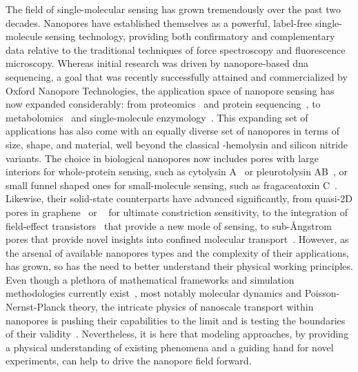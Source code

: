The field of single-molecular sensing has grown tremendously over the past two decades. Nanopores have
established themselves as a powerful, label-free single-molecule sensing technology, providing both
confirmatory and complementary data relative to the traditional techniques of force spectroscopy and
fluorescence microscopy. Whereas initial research was driven by nanopore-based \gls{dna} sequencing, a goal
that was recently successfully attained and commercialized by Oxford Nanopore Technologies, the application
space of nanopore sensing has now expanded considerably: from proteomics~\cite{Yusko-2017,Houghtaling-2019}
and protein sequencing~\cite{Restrepo-Perez-2018}, to metabolomics~\cite{Zernia-2020} and single-molecule
enzymology~\cite{Galenkamp-2020,Willems-VanMeervelt-2017}. This expanding set of applications has also come
with an equally diverse set of nanopores in terms of size, shape, and material, well beyond the classical
\ta-hemolysin and silicon nitride variants. The choice in biological nanopores now includes pores with large
interiors for whole-protein sensing, such as cytolysin A~\cite{Soskine-2012} or pleurotolysin
AB~\cite{Huang-2020}, or small funnel shaped ones for small-molecule sensing, such as fragaceatoxin
C~\cite{Huang-2017,Restrepo-Perez-2019a}. Likewise, their solid-state counterparts have advanced
significantly, from quasi-2D pores in graphene~\cite{Fischbein-2008} or ~\cite{Feng-2015b} for
ultimate constriction sensitivity, to the integration of field-effect transistors~\cite{Ren-2020} that provide
a new mode of sensing, to sub-\AA{}ngstrom pores that provide novel insights into confined molecular
transport~\cite{Rigo-2019}. However, as the arsenal of available nanopores types and the complexity of their
applications, has grown, so has the need to better understand their physical working principles. Even though a
plethora of mathematical frameworks and simulation methodologies currently exist~\cite{Maffeo-2012}, most
notably molecular dynamics and Poisson-Nernst-Planck theory, the intricate physics of nanoscale transport
within nanopores is pushing their capabilities to the limit and is testing the boundaries of their
validity~\cite{Collins-2012}. Nevertheless, it is here that modeling approaches, by providing a physical
understanding of existing phenomena and a guiding hand for novel experiments, can help to drive the nanopore
field forward.


\cleardoublepage

